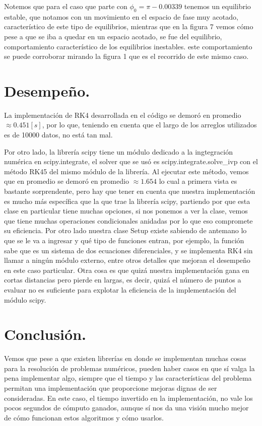 \documentclass[letter, 11pt]{article}
\begin{document}
Notemos que para el caso que parte con $\phi_0=\pi-0.00339$ tenemos un equilibrio estable, que notamos con un movimiento en el espacio de fase muy acotado, característico de este tipo de equilibrios, mientras que en la figura 7 vemos cómo pese a que se iba a quedar en un espacio acotado, se fue del equilibrio, comportamiento característico de los equilibrios inestables. este comportamiento se puede corroborar mirando la figura 1 que es el recorrido de este mismo caso.



\newpage

\newpage

\section{Desempeño.}




La implementación de RK4 desarrollada en el código se demoró en promedio $\approx 0.451 [s]$, por lo que, teniendo en cuenta que el largo de los arreglos utilizados es de 10000 datos, no está tan mal.

Por otro lado, la librería scipy tiene un módulo dedicado a la ingtegración numérica en scipy.integrate, el solver que se usó es scipy.integrate.solve\_ivp con el método RK45 del mismo módulo de la librería. Al ejecutar este método, vemos que en promedio se demoró en promedio $\approx 1.654$ lo cual a primera vista es bastante sorprendente, pero hay que tener en cuenta que nuestra implementación es mucho más específica que la que trae la librería scipy, partiendo por que esta clase en particular tiene muchas opciones, si nos ponemos a ver la clase, vemos que tiene muchas operaciones condicionales anidadas por lo que eso compromete su eficiencia. Por otro lado nuestra clase Setup existe sabiendo de antemano lo que se le va a ingresar y qué tipo de funciones entran, por ejemplo, la función sabe que es un sistema de dos ecuaciones diferenciales, y se implementa RK4 sin llamar a ningún módulo externo, entre otros detalles que mejoran el desempeño en este caso particular.
Otra cosa es que quizá nuestra implementación gana en cortas distancias pero pierde en largas, es decir, quizá el número de puntos a evaluar no es suficiente para explotar la eficiencia de la implementación del módulo scipy.


\section{Conclusión.}

Vemos que pese a que existen librerías en donde se implementan muchas cosas para la resolución de problemas numéricos, pueden haber casos en que sí valga la pena implementar algo, siempre que el tiempo y las características del problema permitan una implementación que proporcione mejoras dignas de ser consideradas. En este caso, el tiempo invertido en la implementación, no vale los pocos segundos de cómputo ganados, aunque sí nos da una visión mucho mejor de cómo funcionan estos algoritmos y cómo usarlos.
\end{document}
